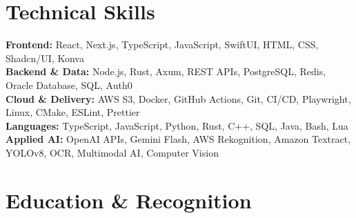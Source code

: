 \documentclass{../../../../Styles/MG-Style}
\begin{document}
\begin{itemize}
\end{itemize}

\section{Technical Skills}
\small
\textbf{Frontend:} React, Next.js, TypeScript, JavaScript, SwiftUI, HTML, CSS, Shadcn/UI, Konva \\
\textbf{Backend \& Data:} Node.js, Rust, Axum, REST APIs, PostgreSQL, Redis, Oracle Database, SQL, Auth0 \\
\textbf{Cloud \& Delivery:} AWS S3, Docker, GitHub Actions, Git, CI/CD, Playwright, Linux, CMake, ESLint, Prettier \\
\textbf{Languages:} TypeScript, JavaScript, Python, Rust, C++, SQL, Java, Bash, Lua \\
\textbf{Applied AI:} OpenAI APIs, Gemini Flash, AWS Rekognition, Amazon Textract, YOLOv8, OCR, Multimodal AI, Computer Vision

\section{Education \& Recognition}

\begin{itemize}
\end{itemize}
\end{document}
